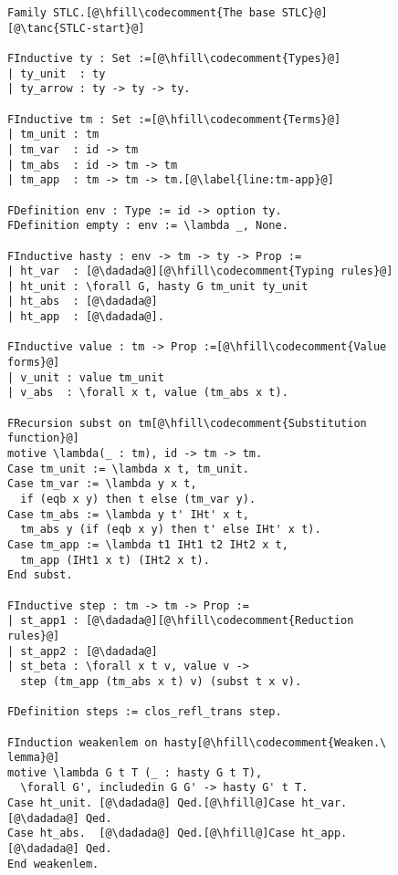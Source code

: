 \begin{figure}
\begin{minipage}{\textwidth}
\begin{multicols}{2}



\begin{lstlisting}
Family STLC.[@\hfill\codecomment{The base STLC}@][@\tanc{STLC-start}@]

FInductive ty : Set :=[@\hfill\codecomment{Types}@]
| ty_unit  : ty
| ty_arrow : ty -> ty -> ty.

FInductive tm : Set :=[@\hfill\codecomment{Terms}@]
| tm_unit : tm
| tm_var  : id -> tm
| tm_abs  : id -> tm -> tm
| tm_app  : tm -> tm -> tm.[@\label{line:tm-app}@]

FDefinition env : Type := id -> option ty.
FDefinition empty : env := \lambda _, None.

FInductive hasty : env -> tm -> ty -> Prop :=
| ht_var  : [@\dadada@][@\hfill\codecomment{Typing rules}@]
| ht_unit : \forall G, hasty G tm_unit ty_unit
| ht_abs  : [@\dadada@]
| ht_app  : [@\dadada@].

FInductive value : tm -> Prop :=[@\hfill\codecomment{Value forms}@]
| v_unit : value tm_unit
| v_abs  : \forall x t, value (tm_abs x t).

FRecursion subst on tm[@\hfill\codecomment{Substitution function}@] 
motive \lambda(_ : tm), id -> tm -> tm.
Case tm_unit := \lambda x t, tm_unit.
Case tm_var := \lambda y x t,
  if (eqb x y) then t else (tm_var y).
Case tm_abs := \lambda y t' IHt' x t,
  tm_abs y (if (eqb x y) then t' else IHt' x t).
Case tm_app := \lambda t1 IHt1 t2 IHt2 x t,
  tm_app (IHt1 x t) (IHt2 x t).
End subst.

FInductive step : tm -> tm -> Prop :=
| st_app1 : [@\dadada@][@\hfill\codecomment{Reduction rules}@]
| st_app2 : [@\dadada@]
| st_beta : \forall x t v, value v ->
  step (tm_app (tm_abs x t) v) (subst t x v).

FDefinition steps := clos_refl_trans step.

FInduction weakenlem on hasty[@\hfill\codecomment{Weaken.\ lemma}@]
motive \lambda G t T (_ : hasty G t T),
  \forall G', includedin G G' -> hasty G' t T.
Case ht_unit. [@\dadada@] Qed.[@\hfill@]Case ht_var. [@\dadada@] Qed.
Case ht_abs.  [@\dadada@] Qed.[@\hfill@]Case ht_app. [@\dadada@] Qed.
End weakenlem.


\end{lstlisting}
\end{multicols}
\end{minipage}
\end{figure}
